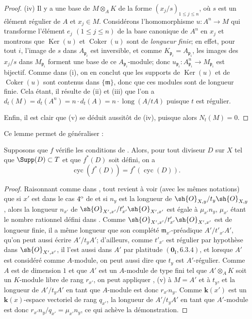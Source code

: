 \begin{proof}
(iv) Il y a une base de $M\otimes_AK$ de la forme $(x_j/s)_{1\leq j\leq n}$, où $s$ est un élément régulier de $A$ et $x_j\in M$.
Considérons l'homomorphisme $u:A^n\to M$ qui transforme l'élément $e_j$ $(1\leq j\leq n)$ de la base canonique de $A^n$ en $x_j$ et montrons que $\operatorname{Ker}(u)$ et $\operatorname{Coker}(u)$ sont de \emph{longueur finie};
en effet, pour tout $i$, l'image de $s$ dans $A_{\mathfrak{p}_i}$ est inversible, et comme $K_{\mathfrak{p}_i}=A_{\mathfrak{p}_i}$, les images des $x_j/s$ dans $M_{\mathfrak{p}_i}$ forment une base de ce $A_{\mathfrak{p}_i}$-module;
donc $u_{\mathfrak{p}_i}:A_{\mathfrak{p}_i}^n\to M_{\mathfrak{p}_i}$ est bijectif.
Comme dans (i), on en conclut que les supports de $\operatorname{Ker}(u)$ et de $\operatorname{Coker}(u)$ sont contenus dans $\{\mathfrak{m}\}$, donc que ces modules sont de longueur finie.
Cela étant, il résulte de (ii) et (iii) que l'on a $d_t(M)=d_t(A^n)=n\cdot d_t(A)=n\cdot\operatorname{long}(A/tA)$ puisque $t$ est régulier.

Enfin, il est clair que (v) se déduit aussitôt de (iv), puisque alors $N_t(M)=0$.
\end{proof}

Ce lemme permet de généraliser :

\begin{proposition}[21.10.13]
\label{IV.21.10.13bis}
Supposons que $f$ vérifie les conditions de .
Alors, pour tout diviseur $D$ sur $X$ tel que $\Supp(D)\subset T$ et que $f^*(D)$ soit défini, on a
\[
\label{IV.21.10.13.1}
  \operatorname{cyc}(f^*(D))=f^*(\operatorname{cyc}(D)).
  \tag{21.10.13.1}
\]
\end{proposition}

\begin{proof}
Raisonnant comme dans , tout revient à voir (avec les mêmes notations) que si $x'$ est dans le cas $4\textsuperscript{o}$ de  et si $n_y$ est la longueur de $\sh{O}_{X,y}/t_y\sh{O}_{X,y}$, alors la
longueur $n_{x'}$ de $\sh{O}_{X',x'}/t'_{x'}\sh{O}_{X',x'}$ est égale à $\mu_{x'}n_y$, $\mu_{x'}$ étant le nombre rationnel défini dans .
Comme $\sh{O}_{X',x'}/t'_{x'}\sh{O}_{X',x'}$ est de longueur finie, il a même longueur que son complété $\mathfrak{m}_{x'}$-préadique $A'/t'_{x'}A'$, qu'on peut aussi écrire $A'/t_yA'$;
d'ailleurs, comme $t'_{x'}$ est régulier par hypothèse dans $\sh{O}_{X',x'}$, il l'est aussi dans $A'$ par platitude $(\mathbf{0}_{\mathrm{I}},6.3.4)$, et lorsque $A'$ est considéré comme $A$-module, on peut aussi dire que $t_y$ est $A'$-régulier.
Comme $A$ est de dimension $1$ et que $A'$ est un $A$-module de type fini tel que $A'\otimes_AK$ soit un $K$-module libre de rang $r_{x'}$, on peut appliquer , (v) à $M=A'$ et à $t_y$, et la longueur de $A'/t_yA'$ en tant que $A$-module est donc $r_{x'}n_y$.
Comme $\boldsymbol{k}(x')$ est un $\boldsymbol{k}(x)$-espace vectoriel de rang $q_{x'}$, la longueur de $A'/t_yA'$ en tant que $A'$-module est donc $r_{x'}n_y/q_{x'}=\mu_{x'}n_y$, ce qui achève la démonstration.
\end{proof}

